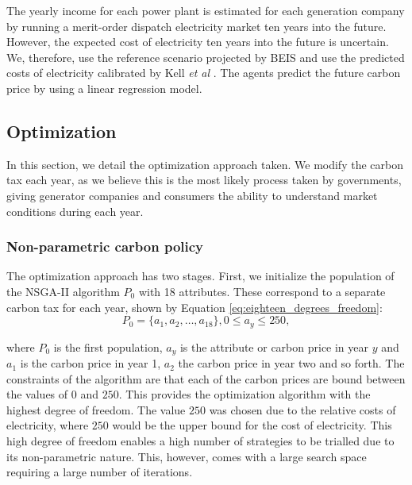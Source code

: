 The yearly income for each power plant is estimated for each generation company by running a merit-order dispatch electricity market ten years into the future. However, the expected cost of electricity ten years into the future is uncertain. We, therefore, use the reference scenario projected by BEIS and use the predicted costs of electricity calibrated by Kell \textit{et al} \cite{DBEIS2019, Kell2020}. The agents predict the future carbon price by using a linear regression model.




\subsection{Optimization}

In this section, we detail the optimization approach taken. We modify the carbon tax each year, as we believe this is the most likely process taken by governments, giving generator companies and consumers the ability to understand market conditions during each year.

\label{ssec:optimization}
\subsubsection{Non-parametric carbon policy}
\label{sssec:non_parametric_strategy}
The optimization approach has two stages. First, we initialize the population of the NSGA-II algorithm $P_0$ with 18 attributes. These correspond to a separate carbon tax for each year, shown by Equation \ref{eq:eighteen_degrees_freedom}:
\begin{equation}
\label{eq:eighteen_degrees_freedom}
P_0=\{a_1,a_2,\ldots,a_{18}\}, 0\leq a_y\leq 250,
\end{equation} 

\noindent where $P_0$ is the first population, $a_y$ is the attribute or carbon price in year $y$ and $a_1$ is the carbon price in year 1, $a_2$ the carbon price in year two and so forth. The constraints of the algorithm are that each of the carbon prices are bound between the values of \textsterling$0$ and \textsterling$250$. This provides the optimization algorithm with the highest degree of freedom. The value \textsterling$250$ was chosen due to the relative costs of electricity, where \textsterling$250$ would be the upper bound for the cost of electricity. This high degree of freedom enables a high number of strategies to be trialled due to its non-parametric nature. This, however, comes with a large search space requiring a large number of iterations. 


